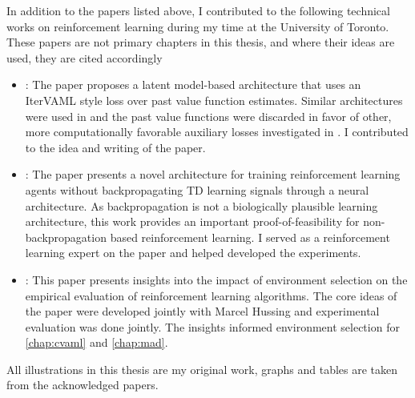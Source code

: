 In addition to the papers listed above, I contributed to the following technical works on reinforcement learning during my time at the University of Toronto. These papers are not primary chapters in this thesis, and where their ideas are used, they are cited accordingly
\begin{itemize}
	\item {}: The paper proposes a latent model-based architecture that uses an IterVAML \parencite{itervaml} style loss over past value function estimates. Similar architectures were used in \textcite{voelcker2023lambda,voelcker2025mad,voelcker2025calibrated} and the past value functions were discarded in favor of other, more computationally favorable auxiliary losses investigated in \textcite{voelcker2024when}.
	I contributed to the idea and writing of the paper.
	\item {}: The paper presents a novel architecture for training reinforcement learning agents without backpropagating TD learning signals through a neural architecture.
	As backpropagation is not a biologically plausible learning architecture, this work provides an important proof-of-feasibility for non-backpropagation based reinforcement learning.
    I served as a reinforcement learning expert on the paper and helped developed the experiments.
	\item {}: This paper presents insights into the impact of environment selection on the empirical evaluation of reinforcement learning algorithms.
	The core ideas of the paper were developed jointly with Marcel Hussing and experimental evaluation was done jointly.
    The insights informed environment selection for \autoref{chap:cvaml} and \autoref{chap:mad}.
\end{itemize}

All illustrations in this thesis are my original work, graphs and tables are taken from the acknowledged papers.